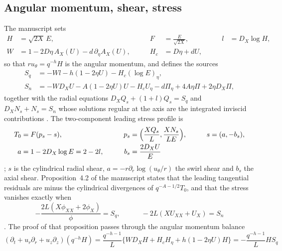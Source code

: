 \documentclass[11pt]{article}
\newcommand{\DX}{D_X}
\newcommand{\Hc}{H_c}
\newcommand{\bs}{b_s}
\newcommand{\Sq}{S_q}
\newcommand{\Sn}{S_n}
\newcommand{\Ns}{N_s}
\newcommand{\Qs}{Q_s}
\newcommand{\AX}{A_X}
\begin{document}
\subsection{Angular momentum, shear, stress}
The manuscript sets \cite[(4.8), p.~26]{OpenAINS}
\begin{equation}\label{eq:48}
\begin{aligned}
H&=\sqrt{2X}\,E,&\qquad F&=\frac{E}{\sqrt{2X}},&\qquad l&=\DX\log H,\\
W&=1-2D\eta\,\AX(U)-d\,\partial_\eta\AX(U),&\qquad \Hc&=D\eta+dU,
\end{aligned}
\end{equation}
so that $ru_\theta=q^{-h}H$ is the angular momentum, and defines the sources
\begin{equation}\label{eq:49}
\begin{aligned}
\Sq&=-Wl-h(1-2\eta U)-\Hc(\log E)_\eta,\\
\Sn&=-W\DX U-A(1-2\eta U)U-\Hc U_\eta-d\Pi_\eta+4A\eta\Pi+2\eta\DX\Pi,
\end{aligned}
\end{equation}
together with the radial equations $\DX\Qs+(1+l)\Qs=\Sq$ and $\DX\Ns+\Ns=\Sn$ whose solutions regular at the axis are the integrated inviscid contributions \cite[(4.9)--(4.10), p.~26]{OpenAINS}. The two-component leading stress profile is
\begin{equation}\label{eq:411}
\begin{aligned}
T_0&=F(p_s-s),&\qquad p_s&=\Bigl(\frac{X\Qs}{L},\frac{X\Ns}{LE}\Bigr),&\qquad s&=(a,-\bs),\\
a&=1-2\DX\log E=2-2l,&\qquad \bs&=\frac{2\DX U}{E}
\end{aligned}
\end{equation}
\cite[(4.11), p.~27]{OpenAINS}; $s$ is the cylindrical radial shear, $a=-r\partial_r\log(u_\theta/r)$ the swirl shear and $\bs$ the axial shear. Proposition~4.2 of the manuscript states that the leading tangential residuals are minus the cylindrical divergences of $q^{-A-1/2}T_0$, and that the stress vanishes exactly when
\begin{equation}\label{eq:413}
-\frac{2L(X\phi_{XX}+2\phi_X)}{\phi}=\Sq,\qquad\quad -2L(XU_{XX}+U_X)=\Sn
\end{equation}
\cite[(4.13), p.~27]{OpenAINS}. The proof of that proposition passes through the angular momentum balance
\begin{equation}\label{eq:414}
(\partial_t+u_r\partial_r+u_z\partial_z)(q^{-h}H)=\frac{q^{-h-1}}{L}\bigl\{W\DX H+\Hc H_\eta+h(1-2\eta U)H\bigr\}=-\frac{q^{-h-1}}{L}H\Sq
\end{equation}
\end{document}
